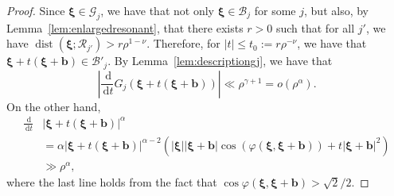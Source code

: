 \documentclass[10pt]{amsart}
\theoremstyle{definition}\newtheorem{defi}[theo]{Definition}\newtheorem{rema}[theo]{Remark}\newtheorem{exam}[theo]{Example}\newtheorem{nota}[theo]{Notation}
\DeclareMathOperator{\dist}{dist}
\newcommand{\de}{\, \mathrm{d}}
\newcommand{\CB}{\mathcal{B}}
\newcommand{\CG}{\mathcal{G}}
\newcommand{\CR}{\mathcal{R}}
\newcommand{\bxi}{\boldsymbol \xi}
\newcommand{\bbb}{\mathbf b}
\renewcommand{\phi}{\varphi}
\newcommand{\smallo}[1]{o\left(#1 \right)}
\newcommand{\abs}[1]{\left\lvert #1 \right\rvert}
\begin{document}
\begin{proof}
Since $\bxi \in \CG_j$, we have that not only $\bxi \in \CB_j$ for some $j$, but also, by Lemma~\ref{lem:enlargedresonant}, that there exists $r > 0$ such that for all $j'$, we have $\dist(\bxi;\CR_{j'}) > r \rho^{1-\nu}$. Therefore, for $\abs t \le t_0 := r \rho^{-\nu}$, we have that $\bxi + t(\bxi + \bbb) \in \CB'_j$. By Lemma~\ref{lem:descriptiongj}, we have that
\begin{equation}
\abs{\frac{\de}{\de t} G_j(\bxi + t(\bxi + \bbb))} \ll \rho^{\gamma+1} = \smallo{ \rho^\alpha}.
\end{equation}
On the other hand,
\begin{align}
\frac{\de}{\de t}& \abs{\bxi + t(\bxi + \bbb)}^\alpha\\ &= \alpha
\abs{\bxi + t (\bxi + \bbb)}^{\alpha - 2} \left(\abs \bxi \abs{\bxi +
\bbb}\cos\left(\phi(\bxi,\bxi+\bbb)\right) + t \abs{\bxi+\bbb}^2 \right)\nonumber\\
& \gg \rho^\alpha,
\end{align}
where the last line holds from the fact that $\cos \phi(\bxi,\bxi + \bbb) > \sqrt{2}/2$.
\end{proof}
\end{document}
